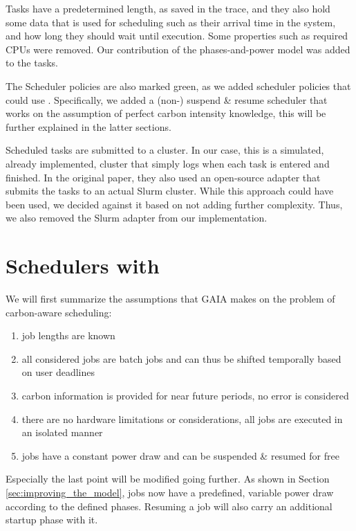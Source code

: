 Tasks have a predetermined length, as saved in the trace, and they also hold some data that is used for scheduling such as their arrival time in the system, and how long they should wait until execution. 
Some properties such as required CPUs were removed.
Our contribution of the phases-and-power model was added to the tasks.

The Scheduler policies are also marked green, as we added scheduler policies that could use \modelname. Specifically, we added a (non-) suspend \& resume scheduler that works on the assumption of perfect carbon intensity knowledge, this will be further explained in the latter sections.

Scheduled tasks are submitted to a cluster.
In our case, this is a simulated, already implemented, cluster that simply logs when each task is entered and finished. 
In the original paper, they also used an open-source adapter that submits the tasks to an actual Slurm cluster. 
While this approach could have been used, we decided against it based on not adding further complexity. 
Thus, we also removed the Slurm adapter from our implementation.

\chapter{Schedulers with \modelname{}}

We will first summarize the assumptions that GAIA makes on the problem of carbon-aware scheduling:

\begin{enumerate}
    \item job lengths are known
    \item all considered jobs are batch jobs and can thus be shifted temporally based on user deadlines
    \item carbon information is provided for near future periods, no error is considered
    \item there are no hardware limitations or considerations, all jobs are executed in an isolated manner
    \item jobs have a constant power draw and can be suspended \& resumed for free
\end{enumerate}

Especially the last point will be modified going further. As shown in Section \ref{sec:improving_the_model}, jobs now have a predefined, variable power draw according to the defined phases. Resuming a job will also carry an additional startup phase with it.

